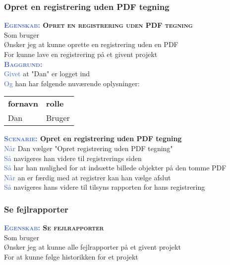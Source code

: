 \subsubsection{Opret en registrering uden PDF tegning}
\textbf{\textsc{\textcolor{RoyalBlue}{Egenskab:} Opret en registrering uden PDF tegning}}\\
Som bruger\\
Ønsker jeg at kunne oprette en registrering uden en PDF\\
For kunne lave en registrering på et givent projekt\\

\textsc{\textcolor{RoyalBlue}{\textbf{Baggrund:}}}\\
\textcolor{RoyalBlue}{Givet} at "Dan" er logget ind\\
\textcolor{RoyalBlue}{Og} han har følgende nuværende oplysninger:\\
\begin{tabular}{| l | l |}
	\textbf{fornavn} & \textbf{rolle} \\
	Dan & Bruger\\
\end{tabular}
\newline \newline

\textbf{\textsc{\textcolor{RoyalBlue}{Scenarie:}} Opret en registrering uden PDF tegning}\\
\textcolor{RoyalBlue}{Når} Dan vælger "Opret registrering uden PDF tegning"\\
\textcolor{RoyalBlue}{Så} navigeres han videre til registrerings siden\\
\textcolor{RoyalBlue}{Så} har han mulighed for at indsætte billede objekter på den tomme PDF\\
\textcolor{RoyalBlue}{Når} an er færdig med at registrer kan han vælge afslut\\
\textcolor{RoyalBlue}{Så} navigeres hans videre til tilsyns rapporten for hans registrering\\

\subsubsection{Se fejlrapporter} %
\textbf{\textsc{\textcolor{RoyalBlue}{Egenskab:} Se fejlrapporter}}\\
Som bruger\\
Ønsker jeg at kunne alle fejlrapporter på et givent projekt\\
For at kunne følge historikken for et projekt\\

